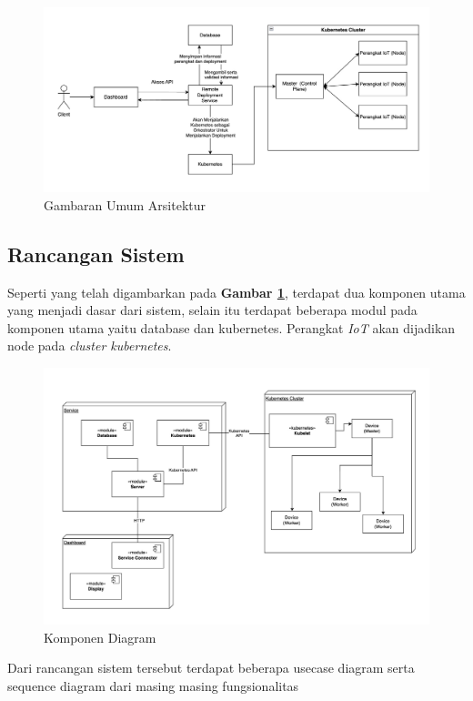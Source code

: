 \begin{figure}[h]
  \centering
  \includegraphics[width=1\textwidth]{resources/chapter-3/gambaran-umum-arsitektur-updated.jpg}
  \caption{Gambaran Umum Arsitektur}
  \label{fig:gambaran-umum-arsitektur}
\end{figure}

\pagebreak



\pagebreak



\subsection{Rancangan Sistem}
Seperti yang telah digambarkan pada \textbf{Gambar \ref{fig:gambaran-umum-arsitektur}}, terdapat dua komponen utama yang menjadi dasar dari sistem, selain itu terdapat beberapa modul pada komponen utama yaitu database dan kubernetes. Perangkat \textit{IoT} akan dijadikan node pada \textit{cluster kubernetes}.

\begin{figure}[h]
  \centering
  \includegraphics[width=1\textwidth]{resources/chapter-3/package-diagram.jpg}
  \caption{Komponen Diagram}
  \label{fig:komponen-diagram}
\end{figure}

\pagebreak

Dari rancangan sistem tersebut terdapat beberapa usecase diagram serta sequence diagram dari masing masing fungsionalitas

